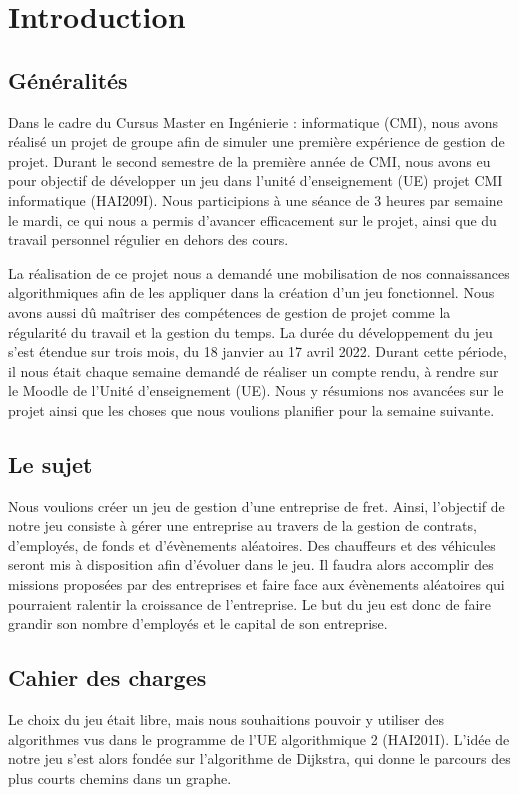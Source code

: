 \documentclass[a4paper, 12pt]{article}
\begin{document}
\newpage


\renewcommand*\contentsname{Sommaire}
\tableofcontents
\newpage
   \section{Introduction}
   \subsection{Généralités}
      Dans le cadre du Cursus Master en Ingénierie : informatique (CMI), nous avons réalisé un projet de groupe afin de simuler une première expérience de gestion de projet. Durant le second semestre de la première année de CMI, nous avons eu pour objectif de développer un jeu dans l'unité d'enseignement (UE) projet CMI informatique (HAI209I). Nous participions  à une séance de 3 heures par semaine le mardi, ce qui nous a permis d'avancer efficacement sur le projet, ainsi que du travail personnel régulier en dehors des cours.
      
      La réalisation de ce projet nous a demandé une mobilisation de nos connaissances algorithmiques afin de les appliquer dans la création d'un jeu fonctionnel. Nous avons aussi dû maîtriser des compétences de gestion de projet comme la régularité du travail et la gestion du temps. La durée du développement du jeu s'est étendue sur trois mois, du 18 janvier au 17 avril 2022. Durant cette période, il nous était chaque semaine demandé de réaliser un compte rendu, à rendre sur le Moodle de l'Unité d'enseignement (UE). Nous y résumions nos avancées sur le projet ainsi que les choses que nous voulions planifier pour la semaine suivante. 
      
     \subsection{Le sujet}
         Nous voulions créer un jeu de gestion d'une entreprise de fret. Ainsi, l'objectif de notre jeu consiste à  gérer une entreprise au travers de la gestion de contrats, d'employés, de fonds et d'évènements aléatoires. Des chauffeurs et des véhicules seront mis à disposition afin d'évoluer dans le jeu. Il faudra alors accomplir des missions proposées par des entreprises et faire face aux évènements aléatoires qui pourraient ralentir la croissance de l'entreprise. Le but du jeu est donc de faire grandir son nombre d'employés et le capital de son entreprise.
    \subsection{Cahier des charges}
        Le choix du jeu était libre, mais nous souhaitions pouvoir y utiliser des algorithmes vus dans le programme de l'UE algorithmique 2 (HAI201I). L'idée de notre jeu s'est alors fondée sur l'algorithme de Dijkstra, qui donne le parcours des plus courts chemins dans un graphe.
\end{document}
